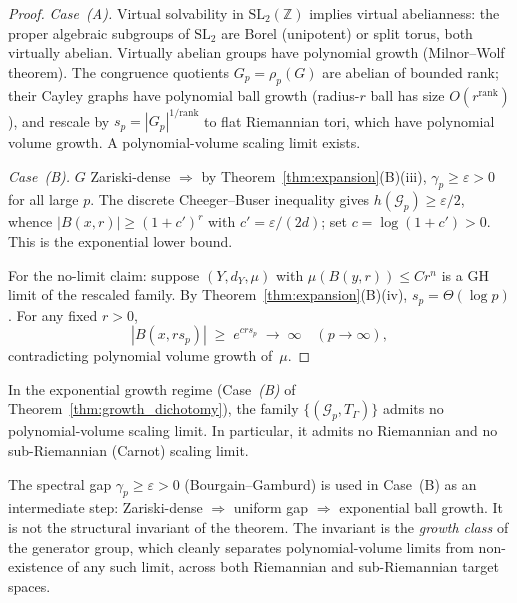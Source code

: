 \begin{proof}
  \emph{Case~(A).}
  Virtual solvability in $\mathrm{SL}_2(\mathbb{Z})$ implies virtual abelianness:
  the proper algebraic subgroups of $\mathrm{SL}_2$ are Borel (unipotent) or
  split torus, both virtually abelian.  Virtually abelian groups have polynomial
  growth (Milnor--Wolf theorem).  The congruence quotients $G_p = \rho_p(G)$
  are abelian of bounded rank; their Cayley graphs have polynomial ball growth
  (radius-$r$ ball has size $O(r^{\mathrm{rank}})$), and rescale by
  $s_p = |G_p|^{1/\mathrm{rank}}$ to flat Riemannian tori, which have
  polynomial volume growth.  A polynomial-volume scaling limit exists.

  \emph{Case~(B).}
  $G$ Zariski-dense $\Rightarrow$ by Theorem~\ref{thm:expansion}(B)(iii),
  $\gamma_p \geq \varepsilon > 0$ for all large $p$.
  The discrete Cheeger--Buser inequality gives $h(\mathcal{G}_p) \geq \varepsilon/2$,
  whence $|B(x, r)| \geq (1 + c')^r$ with $c' = \varepsilon/(2d)$; set
  $c = \log(1 + c') > 0$.  This is the exponential lower bound.

  For the no-limit claim: suppose $(Y, d_Y, \mu)$ with
  $\mu(B(y,r)) \leq Cr^n$ is a GH limit of the rescaled family.
  By Theorem~\ref{thm:expansion}(B)(iv), $s_p = \Theta(\log p)$.
  For any fixed $r > 0$,
  \[|B(x, r s_p)| \;\geq\; e^{cr s_p} \;\to\; \infty \quad (p \to \infty),\]
  contradicting polynomial volume growth of~$\mu$.
\end{proof}

\begin{corollary}
  \label{cor:ncto}
  In the exponential growth regime (Case~\emph{(B)} of
  Theorem~\ref{thm:growth_dichotomy}), the family
  $\{(\mathcal{G}_p, T_\Gamma)\}$ admits no polynomial-volume scaling limit.
  In particular, it admits no Riemannian and no sub-Riemannian (Carnot) scaling
  limit.
\end{corollary}

\begin{remark}
  \label{rem:gap_role}
  The spectral gap $\gamma_p \geq \varepsilon > 0$ (Bourgain--Gamburd) is used in
  Case~(B) as an intermediate step: Zariski-dense $\Rightarrow$ uniform gap
  $\Rightarrow$ exponential ball growth.  It is not the structural invariant
  of the theorem.  The invariant is the \emph{growth class} of the generator
  group, which cleanly separates polynomial-volume limits from non-existence of
  any such limit, across both Riemannian and sub-Riemannian target spaces.
\end{remark}

